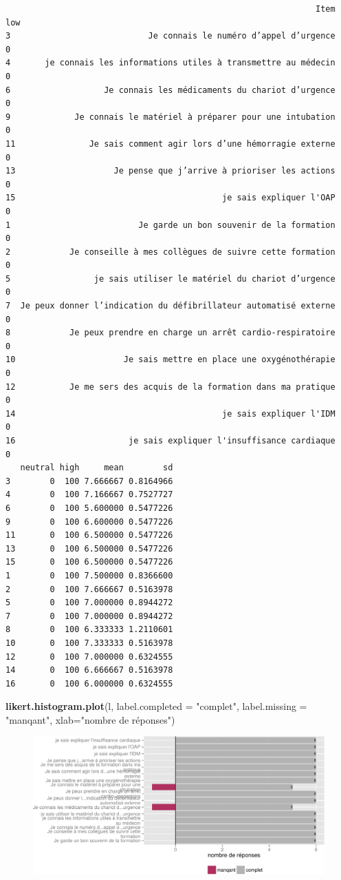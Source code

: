 \documentclass[]{article}
\newenvironment{Shaded}{\begin{snugshade}}{\end{snugshade}}
\newcommand{\KeywordTok}[1]{\textcolor[rgb]{0.13,0.29,0.53}{\textbf{{#1}}}}
\newcommand{\DataTypeTok}[1]{\textcolor[rgb]{0.13,0.29,0.53}{{#1}}}
\newcommand{\StringTok}[1]{\textcolor[rgb]{0.31,0.60,0.02}{{#1}}}
\newcommand{\NormalTok}[1]{{#1}}
\begin{document}
\begin{verbatim}
                                                               Item low
3                            Je connais le numéro d’appel d’urgence   0
4       je connais les informations utiles à transmettre au médecin   0
6                   Je connais les médicaments du chariot d’urgence   0
9             Je connais le matériel à préparer pour une intubation   0
11               Je sais comment agir lors d’une hémorragie externe   0
13                    Je pense que j’arrive à prioriser les actions   0
15                                          je sais expliquer l'OAP   0
1                          Je garde un bon souvenir de la formation   0
2            Je conseille à mes collègues de suivre cette formation   0
5                 je sais utiliser le matériel du chariot d’urgence   0
7  Je peux donner l’indication du défibrillateur automatisé externe   0
8            Je peux prendre en charge un arrêt cardio-respiratoire   0
10                      Je sais mettre en place une oxygénothérapie   0
12           Je me sers des acquis de la formation dans ma pratique   0
14                                          je sais expliquer l'IDM   0
16                       je sais expliquer l'insuffisance cardiaque   0
   neutral high     mean        sd
3        0  100 7.666667 0.8164966
4        0  100 7.166667 0.7527727
6        0  100 5.600000 0.5477226
9        0  100 6.600000 0.5477226
11       0  100 6.500000 0.5477226
13       0  100 6.500000 0.5477226
15       0  100 6.500000 0.5477226
1        0  100 7.500000 0.8366600
2        0  100 7.666667 0.5163978
5        0  100 7.000000 0.8944272
7        0  100 7.000000 0.8944272
8        0  100 6.333333 1.2110601
10       0  100 7.333333 0.5163978
12       0  100 7.000000 0.6324555
14       0  100 6.666667 0.5163978
16       0  100 6.000000 0.6324555
\end{verbatim}

\begin{Shaded}
\begin{Highlighting}[]
\KeywordTok{likert.histogram.plot}\NormalTok{(l, }\DataTypeTok{label.completed =} \StringTok{"complet"}\NormalTok{, }\DataTypeTok{label.missing =} \StringTok{"manqant"}\NormalTok{, }\DataTypeTok{xlab=}\StringTok{"nombre de réponses"}\NormalTok{)}
\end{Highlighting}
\end{Shaded}

\begin{figure}[htbp]
\centering
\includegraphics{./questionaire_distance_files/figure-latex/test-1.pdf}
\end{figure}
\end{document}

